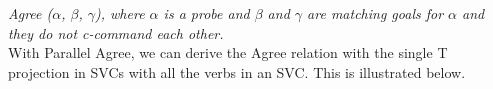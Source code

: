 \documentclass[output=paper,
modfonts
]{langscibook}
\begin{document}
\z
\begin{center}
\end{center}
\emph{Agree ($\alpha$, $\beta$, $\gamma$), where $\alpha$ is a probe and $\beta$ and  $\gamma$ are matching goals for $\alpha$ and they do not c-command each other.}\\

With Parallel Agree, we can derive the Agree relation with the single T projection in SVCs with all the verbs in an SVC. This is illustrated below. 
\end{document}

